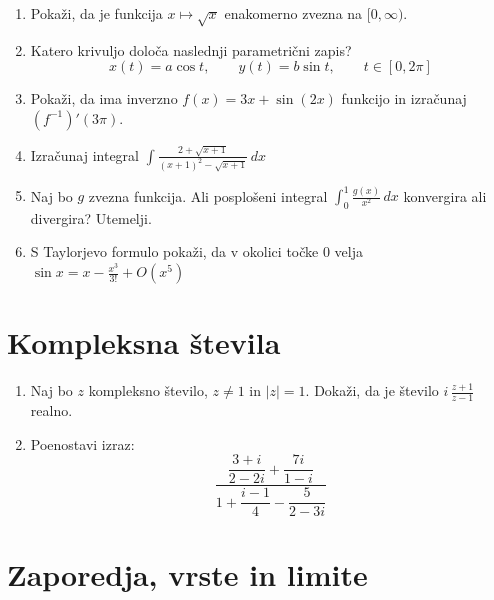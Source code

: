 \documentclass[a4paper,12pt]{article}
\begin{document}
\begin{enumerate}
\item
Pokaži, da je funkcija \(x \mapsto \sqrt{x}\) enakomerno zvezna na \([0,\infty)\).

\item
Katero krivuljo določa naslednji parametrični zapis?
\[
x(t) = a \cos t, \qquad %
y(t) = b \sin t, \qquad %
t \in [0, 2 \pi]
\]

\item
Pokaži, da ima  inverzno \(f(x) = 3x + \sin(2x)\) funkcijo in izračunaj \((f^{-1})'(3\pi)\).

\item
Izračunaj integral
$\displaystyle \int \frac{2+\sqrt{x+1}}{(x+1)^2-\sqrt{x+1}} \, dx$

\item
Naj bo \(g\) zvezna funkcija. Ali posplošeni integral
\(\int_0^1 \frac{g(x)}{x^2}\,dx\)
konvergira ali divergira? Utemelji.

\item
S Taylorjevo formulo pokaži, da v okolici točke \(0\) velja
\(\sin x = x - \frac{x^3}{3!} + O(x^5)\)
\end{enumerate}

\section*{Kompleksna števila}

\begin{enumerate}
\item
Naj bo \(z\) kompleksno število, \(z \ne 1\) in \(|z| = 1\).
Dokaži, da je število \( i \, \frac{z+1}{z-1} \) realno.

\item
Poenostavi izraz:
\[
\frac{
\dfrac{3+i}{2-2i}+\dfrac{7i}{1-i}
}{
1+\dfrac{i-1}{4}-\dfrac{5}{2-3i}
}
\]
\end{enumerate}

\section*{Zaporedja, vrste in limite}
\end{document}
